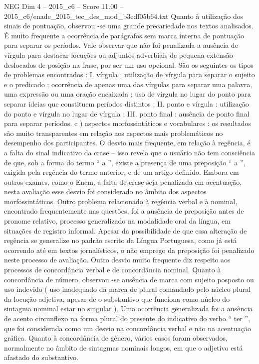 \begin{textsample}{NEG Dim 4 – 2015\_c6 – Score 11.00 – 2015\_c6/enade\_2015\_tec\_des\_mod\_b3edf05b64.txt}
Quanto à utilização dos sinais de pontuação, observou -se uma grande precariedade nos textos analisados.
É muito frequente a ocorrência de parágrafos sem marca interna de pontuação para separar os períodos.
Vale observar que não foi penalizada a ausência de vírgula para destacar locuções ou adjuntos adverbiais de pequena extensão deslocados de posição na frase, por ser um uso opcional.
São os seguintes os tipos de problemas encontrados : I. vírgula : utilização de vírgula para separar o sujeito e o predicado ; ocorrência de apenas uma das vírgulas para separar uma palavra, uma expressão ou uma oração encaixada ; uso de vírgula no lugar do ponto para separar ideias que constituem períodos distintos ; II. ponto e vírgula : utilização do ponto e vírgula no lugar de vírgula ; III. ponto final : ausência de ponto final para separar períodos. c ) aspectos morfossintáticos e vocabulares : os resultados são muito transparentes em relação aos aspectos mais problemáticos no desempenho dos participantes.
O desvio mais frequente, em relação à regência, é a falta do sinal indicativo da crase – isso revela que o usuário não tem consciência de que, sob a forma do termo “ a ”, existe a presença de uma preposição “ a ”, exigida pela regência do termo anterior, e de um artigo definido.
Embora em outros exames, como o Enem, a falta de crase seja penalizada em acentuação, nesta avaliação esse desvio foi considerado no âmbito dos aspectos morfossintáticos.
Outro problema relacionado à regência verbal e à nominal, encontrado frequentemente nas questões, foi a ausência de preposição antes de pronome relativo, processo generalizado na modalidade oral da língua, em situações de registro informal.
Apesar da possibilidade de que essa alteração de regência se generalize no padrão escrito da Língua Portuguesa, como já está ocorrendo até em textos jornalísticos, o não emprego da preposição foi penalizado neste processo de avaliação.
Outro desvio muito frequente diz respeito aos processos de concordância verbal e de concordância nominal.
Quanto à concordância de número, observou -se ausência de marca com sujeito posposto ou uso indevido ( uso inadequado da marca de plural comandado pelo núcleo plural da locução adjetiva, apesar de o substantivo que funciona como núcleo do sintagma nominal estar no singular ).
Uma ocorrência generalizada foi a ausência de acento circunflexo na forma plural do presente do indicativo do verbo “ ter ”, que foi considerada como um desvio na concordância verbal e não na acentuação gráfica.
Quanto à concordância de gênero, vários casos foram observados, normalmente no âmbito de sintagmas nominais longos, em que o adjetivo está afastado do substantivo.

\end{textsample}
